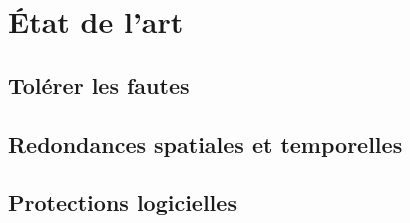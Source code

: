 \section{\'Etat de l'art}
\label{sec:contribution_tf_edla}

\subsection{Tolérer les fautes}
\subsection{Redondances spatiales et temporelles}
\subsection{Protections logicielles}


